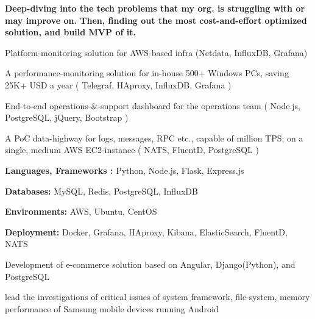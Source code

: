 \documentclass[]{deedy-resume-openfont}
\begin{document}

\textbf{Deep-diving into the tech problems that my org. is struggling with or may improve on. Then, finding out the most cost-and-effort optimized solution, and build MVP of it.}

\begin{tightemize}
\item Platform-monitoring solution for AWS-based infra (Netdata, InfluxDB, Grafana)
\item A performance-monitoring solution for in-house 500+ Windows PCs, saving 25K+ USD a year ( Telegraf, HAproxy, InfluxDB, Grafana )
\item End-to-end operations-\&-support dashboard for the operations team ( Node.js, PostgreSQL, jQuery, Bootstrap )
\item A PoC data-highway for logs, messages, RPC etc., capable of million TPS; on a single, medium AWS EC2-instance ( NATS, FluentD, PostgreSQL )
 
\end{tightemize}
\smallskip


\begin{tightemize}
\item \textbf{Languages, Frameworks :}   Python, Node.js, Flask, Express.js
\item \textbf{Databases:}    MySQL, Redis, PostgreSQL, InfluxDB 
\item \textbf{Environments:}   AWS, Ubuntu, CentOS
\item \textbf{Deployment:} Docker, Grafana, HAproxy, Kibana, ElasticSearch, FluentD, NATS
\end{tightemize}
\sectionsep

\begin{tightemize}
\item Development of e-commerce solution based on Angular, Django(Python), and PostgreSQL
\end{tightemize}
\sectionsep

\begin{tightemize}
\item lead the investigations of critical issues of system framework, file-system, memory performance of Samsung mobile devices running Android
\end{tightemize}
\sectionsep
\end{document}
